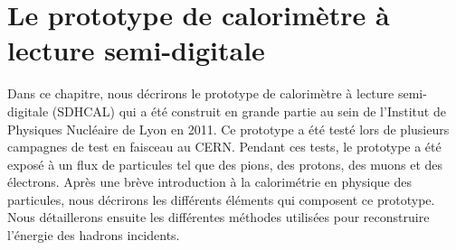 \chapter{Le prototype de calorimètre à lecture semi-digitale}
\label{chap.sdhcal}
Dans ce chapitre, nous décrirons le prototype de calorimètre à lecture semi-digitale (SDHCAL) qui a été construit en grande partie au sein de l’Institut de Physiques Nucléaire de Lyon en 2011. Ce prototype a été testé lors de plusieurs campagnes de test en faisceau au CERN. Pendant ces tests, le prototype a été exposé à un flux de particules tel que des pions, des protons, des muons et des électrons. Après une brève introduction à la calorimétrie en physique des particules, nous décrirons les différents éléments qui composent ce prototype. Nous détaillerons ensuite les différentes méthodes utilisées pour reconstruire l’énergie des hadrons incidents.
\minitoc
\newpage


